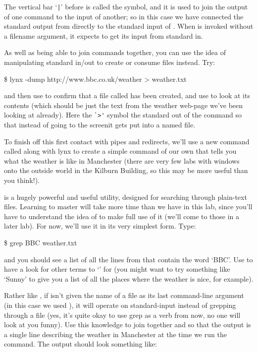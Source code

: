 The vertical bar `\verb-|-' before  is called the  symbol, and it is used to join the output of one command to the input of another; so in this case we have connected the standard output from  directly to the standard input of . When  is invoked without a filename argument, it expects to get its input from standard in.

As well as being  able to join commands together, you can use the idea of manipulating standard in/out to create or consume files instead. Try:

\begin{ttoutenv}
\$ lynx -dump http://www.bbc.co.uk/weather > weather.txt
\end{ttoutenv}

and then use  to confirm that a file called  has been created, and use  to look at its contents (which should be just the text from the weather web-page we've been looking at already). Here the \verb-`>'- symbol  the standard out of the  command so that instead of going to the screenit gets put into a named file. 

To finish off this first contact with pipes and redirects, we'll use a new command called  along with lynx to create a simple command of our own that tells you what the weather is like in Manchester (there are very few labs with windows onto the outside world in the Kilburn Building, so this may be more useful than you think!). 

 is a hugely powerful and useful utility, designed for searching through plain-text files. Learning to master  will take more time than we have in this lab, since you'll have to understand the idea of  to make full use of it (we'll come to those in a later lab). For now, we'll use it in its very simplest form. Type:

\begin{ttoutenv}
\$ grep BBC weather.txt
\end{ttoutenv}

and you should see a list of all the lines from  that contain the word `BBC'. Use  to have a look for other terms to `' for (you might want to try something like `Sunny' to give you a list of all the places where the weather is nice, for example). 

Rather like , if  isn't given the name of a file as its last command-line argument (in this case we used ), it will operate on standard-input instead of grepping through a file (yes, it's quite okay to use grep as a verb from now, no one will look at you funny). Use this knowledge to join together  and  so that the output is a single line describing the weather in Manchester at the time we run the command. The output should look something like:

